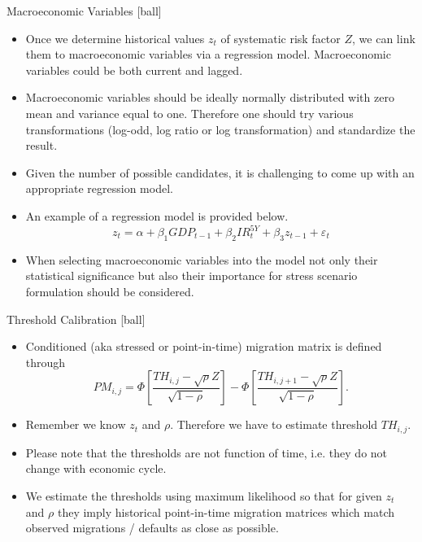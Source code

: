 \documentclass{beamer}
\begin{document}
\begin{frame}{Macroeconomic Variables}
[ball]
\begin{itemize}
	\item Once we determine historical values $z_t$ of systematic risk factor $Z$, we can link them to macroeconomic variables via a regression model. Macroeconomic variables could be both current and lagged.
	\item Macroeconomic variables should be ideally normally distributed with zero mean and variance equal to one. Therefore one should try various transformations (log-odd, log ratio or log transformation) and standardize the result.
	\item Given the number of possible candidates, it is challenging to come up with an appropriate regression model.
	\item An example of a regression model is provided below.
		\begin{equation}
			z_t = \alpha + \beta_1 GDP_{t - 1} + \beta_2 IR^{5Y}_t + \beta_3 z_{t - 1} + \varepsilon_t
		\end{equation}
	\item When selecting macroeconomic variables into the model not only their statistical significance but also their importance for stress scenario formulation should be considered.
\end{itemize}
\end{frame}

\begin{frame}{Threshold Calibration}
[ball]
\begin{itemize}
	\item Conditioned (aka stressed or point-in-time) migration matrix is defined through
		\begin{equation}
			PM_{i,j} = \Phi\left[\frac{TH_{i, j} - \sqrt{\rho}Z}{\sqrt{1 - 
			\rho}}\right] - \Phi\left[\frac{TH_{i, j + 1} - \sqrt{\rho}Z}{\sqrt{1 - 
			\rho}}\right].
		\end{equation}
	\item Remember we know $z_t$ and $\rho$. Therefore we have to estimate threshold $TH_{i, j}$.
	\item Please note that the thresholds are not function of time, i.e. they do not change with economic cycle.
	\item We estimate the thresholds using maximum likelihood so that for given $z_t$ and $\rho$ they imply historical point-in-time migration matrices which match observed migrations / defaults as close as possible.
\end{itemize}
\end{frame}
\end{document}
